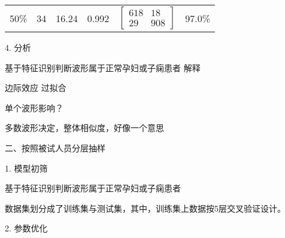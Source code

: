 \begin{center}
\begin{longtable}{m{2cm}<{\centering}m{2cm}<{\centering}m{2cm}<{\centering}m{2cm}<{\centering}m{3cm}<{\centering}m{2cm}<{\centering}}
            50\%         & 34             &   16.24          &    0.992                  &    $\left[ \begin{array}{cc} 618 & 18 \\ 29 & 908 \end{array} \right]$    &           97.0\%              \\                  
\end{longtable}
\end{center}



4. 分析


基于特征识别判断波形属于正常孕妇或子痫患者
解释

边际效应
过拟合

单个波形影响？

多数波形决定，整体相似度，好像一个意思





二、按照被试人员分层抽样

1. 模型初筛

基于特征识别判断波形属于正常孕妇或子痫患者



数据集划分成了训练集与测试集，其中，训练集上数据按5层交叉验证设计。

2. 参数优化



